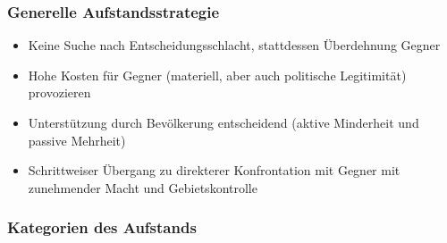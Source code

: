 {}\documentclass[a4paper]{article}
\providecommand{\tightlist}{\setlength{\itemsep}{1mm}\setlength{\parskip}{1mm}}
\begin{document}
\subsubsection{Generelle
	Aufstandsstrategie}\label{generelle-aufstandsstrategie}

\begin{itemize}
	\tightlist
	\item
	      Keine Suche nach Entscheidungsschlacht, stattdessen Überdehnung Gegner
	\item
	      Hohe Kosten für Gegner (materiell, aber auch politische Legitimität)
	      provozieren
	\item
	      Unterstützung durch Bevölkerung entscheidend (aktive Minderheit und
	      passive Mehrheit)
	\item
	      Schrittweiser Übergang zu direkterer Konfrontation mit Gegner mit
	      zunehmender Macht und Gebietskontrolle
\end{itemize}

\subsubsection{Kategorien des Aufstands}\label{kategorien-des-aufstands}
\end{document}
